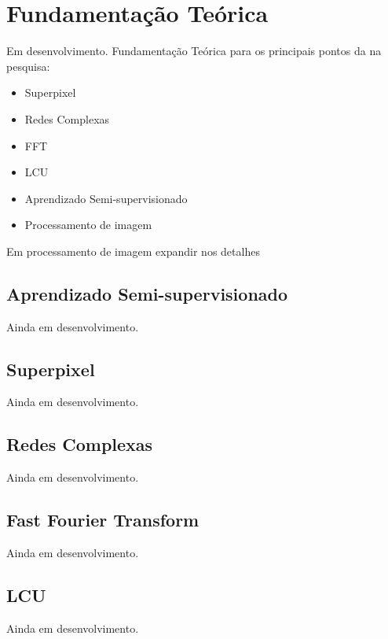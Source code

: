 \chapter{Fundamentação Teórica}\label{cap:fundamentacao-teorica}

Em desenvolvimento. Fundamentação Teórica para os principais pontos da
na pesquisa:

\begin{itemize}
\item Superpixel
\item Redes Complexas
\item \gls{FFT}
\item \gls{LCU}
\item Aprendizado Semi-supervisionado
\item Processamento de imagem
\end{itemize}

Em processamento de imagem expandir nos detalhes


\section{Aprendizado Semi-supervisionado}\label{sec:teorica-aprendizado-semi-supervisionado}

Ainda em desenvolvimento.

\section{Superpixel}\label{sec:teorica-superpixel}

Ainda em desenvolvimento.

\section{Redes Complexas}\label{sec:teorica-redes-complexas}

Ainda em desenvolvimento.

\section{Fast Fourier Transform}\label{sec:teorica-fast-fourier-transform}

Ainda em desenvolvimento.

\section{LCU}\label{sec:teorica-lcu}

Ainda em desenvolvimento.
